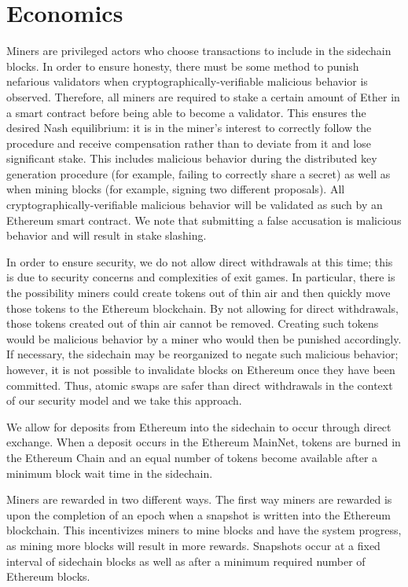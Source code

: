 \section{Economics}

Miners are privileged actors who choose transactions to include
in the sidechain blocks.
In order to ensure honesty, there must be some method to punish
nefarious validators when cryptographically-verifiable malicious
behavior is observed.
Therefore, all miners are required to stake a certain amount of Ether
in a smart contract before being able to become a validator.
This ensures the desired Nash equilibrium: it is in the miner's
interest to correctly follow the procedure and receive compensation
rather than to deviate from it and lose significant stake.
This includes malicious behavior during the distributed key generation
procedure (for example, failing to correctly share a secret) as well
as when mining blocks (for example, signing two different proposals).
All cryptographically-verifiable malicious behavior will be validated
as such by an Ethereum smart contract.
We note that submitting a false accusation is malicious behavior
and will result in stake slashing.

In order to ensure security, we do not allow direct withdrawals
at this time; this is due to security concerns and complexities
of exit games.
In particular, there is the possibility miners could create tokens
out of thin air and then quickly move those tokens to the
Ethereum blockchain.
By not allowing for direct withdrawals, those tokens created out
of thin air cannot be removed.
Creating such tokens would be malicious behavior by a miner who would
then be punished accordingly.
If necessary, the sidechain may be reorganized to negate such
malicious behavior;
however, it is not possible to invalidate blocks on Ethereum once
they have been committed.
Thus, atomic swaps are safer than direct withdrawals in the context
of our security model and we take this approach.

We allow for deposits from Ethereum into the sidechain to occur
through direct exchange.
When a deposit occurs in the Ethereum MainNet, tokens are burned
in the Ethereum Chain and an equal number of tokens become available
after a minimum block wait time in the sidechain.

Miners are rewarded in two different ways.
The first way miners are rewarded is upon the completion of an epoch
when a snapshot is written into the Ethereum blockchain.
This incentivizes miners to mine blocks and have the system progress,
as mining more blocks will result in more rewards.
Snapshots occur at a fixed interval of sidechain blocks as well as
after a minimum required number of Ethereum blocks.

